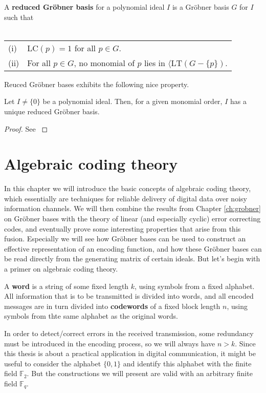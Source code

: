 \documentclass[english,bachelor]{liumaiex}
\begin{document}
\begin{define}
A \textbf{reduced Gröbner basis} for a polynomial ideal $I$ is a Gröbner basis $G$ for $I$ such that \\ \\
\begin{tabular}{ll}
(i) & $\textrm{LC}(p)=1$ for all $p \in G$.\\
(ii) & For all $p\in G$, no monomial of $p$ lies in $\langle \textrm{LT}(G-\{p\})$.
\end{tabular}
\end{define}
Reuced Gröbner bases exhibits the following nice property.

\begin{prop}
Let $I\neq \{0\}$ be a polynomial ideal. Then, for a given monomial order, $I$ has a unique reduced Gröbner basis.
\end{prop}

\begin{proof}
See \cite[pp. 92-93]{cox}
\end{proof}

\chapter{Algebraic coding theory}
In this chapter we will introduce the basic concepts of algebraic coding theory, which essentially are techniques for reliable delivery of digital data over noisy information channels. We will then combine the results from Chapter \ref{ch:grobner} on Gröbner bases with the theory of linear (and especially cyclic) error correcting codes, and eventually prove some interesting properties that arise from this fusion. Especially we will see how Gröbner bases can be used to construct an effective representation of an encoding function, and how these Gröbner bases can be read directly from the generating matrix of certain ideals. But let's begin with a primer on algebraic coding theory.

\begin{define}
A \textbf{word} is a string of some fixed length $k$, using symbols from a fixed alphabet. All information that is to be transmitted is divided into words, and all encoded messages are in turn divided into \textbf{codewords} of a fixed block length $n$, using symbols from thte same alphabet as the original words.
\end{define}
In order to detect/correct errors in the received transmission, some redundancy must be introduced in the encoding process, so we will always have $n>k$. Since this thesis is about a practical application in digital communication, it might be useful to consider the alphabet $\{0,1\}$ and identify this alphabet with the finite field $\mathbb{F}_2$. But the constructions we will present are valid with an arbitrary finite field $\mathbb{F}_q$.
\end{document}
